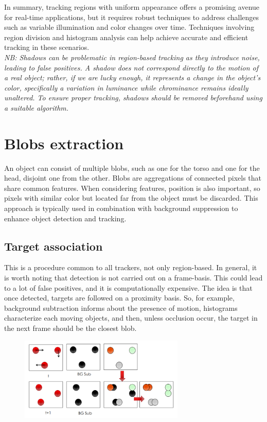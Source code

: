 In summary, tracking regions with uniform appearance offers a promising avenue for real-time applications, but it requires robust techniques to address challenges such as variable illumination and color changes over time. 
Techniques involving region division and histogram analysis can help achieve accurate and efficient tracking in these scenarios.
\\\textit{NB: Shadows can be problematic in region-based tracking as they introduce noise, leading to false positives. 
A shadow does not correspond directly to the motion of a real object; rather, if we are lucky enough, it represents a change in the object's color, specifically a variation in luminance while chrominance remains ideally unaltered. 
To ensure proper tracking, shadows should be removed beforehand using a suitable algorithm.}

\section{Blobs extraction} 
An object can consist of multiple blobs, such as one for the torso and one for the head, disjoint one from the other. Blobs are aggregations of connected pixels that share common features. 
When considering features, position is also important, so pixels with similar color but located far from the object must be discarded. 
This approach is typically used in combination with background suppression to enhance object detection and tracking.
\subsection{Target association}
This is a procedure common to all trackers, not only region-based. In general, it is worth noting that detection is not carried out on a frame-basis.
This could lead to a lot of false positives, and it is computationally expensive.  
The idea is that once detected, targets are followed on a proximity basis. 
So, for example, background subtraction informs about the presence of motion, histograms characterize each moving objects, and then, unless occlusion occur, the target in the next frame should be the closest blob.
\begin{figure}[h]
\centering
\includegraphics[width=0.7\textwidth]{Figures/Target_association.png}
\end{figure}

